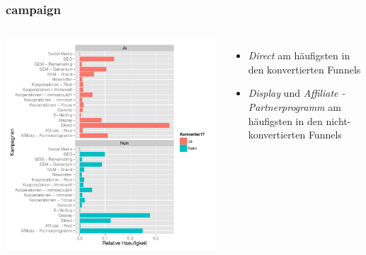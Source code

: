 \begin{frame}\frametitle{campaign}
	\begin{columns}
		\column{7cm}
			\includegraphics[scale=0.39]{campaign.pdf}
		\column{4cm}
			\begin{itemize}
				\item \textit{Direct} am häufigsten in den konvertierten Funnels
				\item \textit{Display} und \textit{Affiliate - Partnerprogramm} am häufigsten in den nicht-konvertierten Funnels
			\end{itemize}
	\end{columns}
\end{frame}

